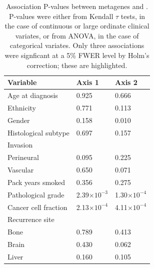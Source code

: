 \documentclass[dissertation.tex]{subfiles}
\begin{document}
\begin{table}[h]
\centering
\caption[Association P-values between metagenes and ]{Association P-values between metagenes and .  P-values were either from Kendall $\tau$ tests, in the case of continuous or large ordinate clinical variates, or from ANOVA, in the case of categorical variates.  Only three associations were signficant at a 5\% FWER level by Holm's correction; these are highlighted.}\label{tab:sigs-mg-cpvs}
\begin{tabular}{@{}lll@{}}
Variable                   & Axis 1                        & Axis 2                        \\ \midrule
Age at diagnosis           & 0.925                         & 0.666                         \\
Ethnicity                  & 0.771                         & 0.113                         \\
Gender                     & 0.158                         & 0.010                         \\
Histological subtype       & 0.697                         & 0.157                         \\
Invasion                   &                               &                               \\
\quad Perineural           & 0.095                         & 0.225                         \\
\quad Vascular             & 0.650                         & 0.071                         \\
Pack years smoked          & 0.356                         & 0.275                         \\
Pathological grade         & 2.39$\times 10^{-3}$          & \cellcolor[HTML]{C0C0C0}1.30$\times 10^{-4}$ \\
Cancer cell fraction       & \cellcolor[HTML]{C0C0C0}2.13$\times 10^{-4}$ & \cellcolor[HTML]{C0C0C0}4.11$\times 10^{-4}$ \\
Recurrence site            &                               &                               \\
\quad Bone                 & 0.789                         & 0.413                         \\
\quad Brain                & 0.430                         & 0.062                         \\
\quad Liver                & 0.160                         & 0.105                         \\

\end{tabular}
\end{table}
\end{document}
